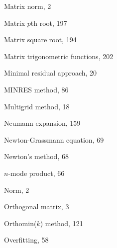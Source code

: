 \begin{description}
{Matrix norm}, {2}\par

{Matrix $p$th root}, {197}\par

{Matrix square root}, {194}\par

{Matrix trigonometric functions}, {202}\par

{Minimal residual approach}, {20}\par

{MINRES method}, {86}\par

{Multigrid method}, {18}\par

\item[N]
{Neumann expansion}, {159}\par

{Newton-Grassmann equation}, {69}\par

{Newton’s method}, {68}\par

{$n$-mode product}, {66}\par

{Norm}, {2}\par

\item[O]
{Orthogonal matrix}, {3}\par

{Orthomin($k$) method}, {121}\par

{Overfitting}, {58}\par


\end{description}
